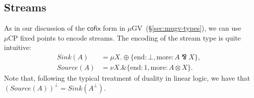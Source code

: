 \documentclass[orivec,envcountsame]{llncs}
\newcommand{\with}{\mathbin\binampersand}
\newcommand{\parr}{\mathbin\bindnasrepma}
\newcommand{\cpdual}[1]{#1^\perp}
\newcommand{\mkwd}[1]{\mathsf{#1}}
\newcommand{\clabel}[1]{\mathrm{#1}}
\newcommand{\lrkwd}{\mkwd{cofix}}
\newcommand{\mucp}{$\mu\mathrm{CP}$\xspace}
\newcommand{\mugv}{$\mu\mathrm{GV}$\xspace}
\newcommand{\secref}[1]{(\S\ref{sec:#1})}
\begin{document}
\subsection{Streams}

As in our discussion of the $\lrkwd$ form in \mugv~\secref{mugv-types}, we can use \mucp fixed
points to encode streams.  The encoding of the stream type is quite intuitive:
\begin{align*}
  Sink(A) &= \mu X. \oplus \{ \clabel{end}: \bot, \clabel{more}: A \parr X \}, \\
  Source(A) &= \nu X. \with \{ \clabel{end}: 1, \clabel{more}: A \otimes X \}.
\end{align*}
Note that, following the typical treatment of duality in linear logic, we have that
$\cpdual{(Source(A))} = Sink(\cpdual{A})$.
\end{document}
